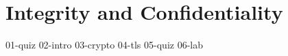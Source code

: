\chapter{Integrity and Confidentiality}

{01-quiz}
{02-intro}
{03-crypto}
{04-tls}
{05-quiz}
{06-lab}

